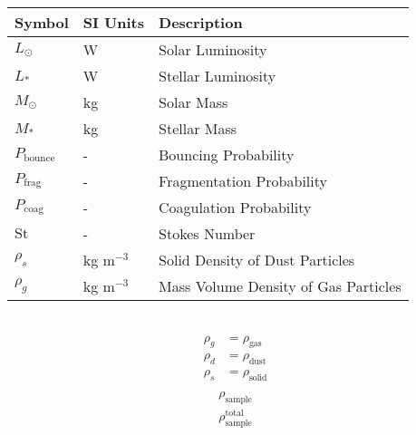     \begin{table}[h!]
        \begin{tabular}{|l|l|l|}
            \hline
            \textbf{Symbol}     & \textbf{SI Units}     & \textbf{Description}
            \\ \hline
            $L_\odot$           & W                     & Solar Luminosity 
            \\ \hline
            $L_*$               & W                     & Stellar Luminosity 
            \\ \hline
            $M_\odot$           & kg                    & Solar Mass 
            \\ \hline
            $M_*$               & kg                    & Stellar Mass 
            \\ \hline
            $P_\text{bounce}$   & -                     & Bouncing Probability
            \\ \hline
            $P_\text{frag}$     & -                     & Fragmentation Probability
            \\ \hline
            $P_\text{coag}$     & -                     & Coagulation Probability
            \\ \hline
            $\text{St}$         & -                     & Stokes Number 
            \\ \hline
            $\rho_s$            & kg m$^{-3}$           & Solid Density of Dust Particles 
            \\ \hline
            $\rho_g$            & kg m$^{-3}$           & Mass Volume Density of Gas Particles 
            \\ \hline
        \end{tabular}
    \end{table} \ \\ 

    \begin{align}
        \rho_g &= \rho_\text{gas} \\
        \rho_d &= \rho_\text{dust} \\
        \rho_s &= \rho_\text{solid} \\
    \end{align}
    \begin{align}
        \rho_\text{sample} \\
        \rho_\text{sample}^\text{total} 
    \end{align}
    
